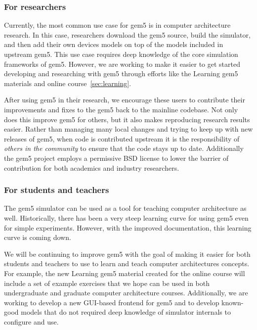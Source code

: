 \subsubsection{For researchers}

Currently, the most common use case for gem5 is in computer architecture research.
In this case, researchers download the gem5 source, build the simulator, and then add their own devices models on top of the models included in upstream gem5.
This use case requires deep knowledge of the core simulation frameworks of gem5.
However, we are working to make it easier to get started developing and researching with gem5 through efforts like the Learning gem5 materials and online course~\ref{sec:learning}.

After using gem5 in their research, we encourage these users to contribute their improvements and fixes to the gem5 back to the mainline codebase.
Not only does this improve gem5 for others, but it also makes reproducing research results easier.
Rather than managing many local changes and trying to keep up with new releases of gem5, when code is contributed upstream it is the responsibility of \emph{others in the community} to ensure that the code stays up to date.
Additionally the gem5 project employs a permissive BSD license to lower the barrier of contribution for both academics and industry researchers.

\subsubsection{For students and teachers}

The gem5 simulator can be used as a tool for teaching computer architecture as well.
Historically, there has been a very steep learning curve for using gem5 even for simple experiments.
However, with the improved documentation, this learning curve is coming down.

We will be continuing to improve gem5 with the goal of making it easier for both students and teachers to use to learn and teach computer architectures concepts.
For example, the new Learning gem5 material created for the online course will include a set of example exercises that we hope can be used in both undergraduate and graduate computer architecture courses.
Additionally, we are working to develop a new GUI-based frontend for gem5 and to develop known-good models that do not required deep knowledge of simulator internals to configure and use.
